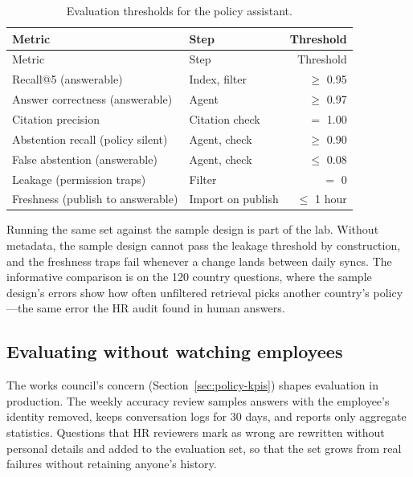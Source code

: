 \begingroup
\small
\begin{longtable}{@{}llr@{}}
\caption{Evaluation thresholds for the policy assistant.}\label{tab:policy-thresholds}\\
\toprule
\rowcolor{coHead} Metric & Step & Threshold \\
\midrule
\endfirsthead
\toprule
\rowcolor{coHead} Metric & Step & Threshold \\
\midrule
\endhead
Recall@5 (answerable) & Index, filter & $\ge$ 0.95 \\
Answer correctness (answerable) & Agent & $\ge$ 0.97 \\
Citation precision & Citation check & $=$ 1.00 \\
Abstention recall (policy silent) & Agent, check & $\ge$ 0.90 \\
False abstention (answerable) & Agent, check & $\le$ 0.08 \\
Leakage (permission traps) & Filter & $=$ 0 \\
Freshness (publish to answerable) & Import on publish & $\le$ 1 hour \\
\bottomrule
\end{longtable}
\endgroup

Running the same set against the sample design is part of the lab. Without metadata, the sample design cannot pass the leakage threshold by construction, and the freshness traps fail whenever a change lands between daily syncs. The informative comparison is on the 120 country questions, where the sample design's errors show how often unfiltered retrieval picks another country's policy---the same error the HR audit found in human answers.

\subsection{Evaluating without watching employees}

The works council's concern (Section~\ref{sec:policy-kpis}) shapes evaluation in production. The weekly accuracy review samples answers with the employee's identity removed, keeps conversation logs for 30 days, and reports only aggregate statistics. Questions that HR reviewers mark as wrong are rewritten without personal details and added to the evaluation set, so that the set grows from real failures without retaining anyone's history.
